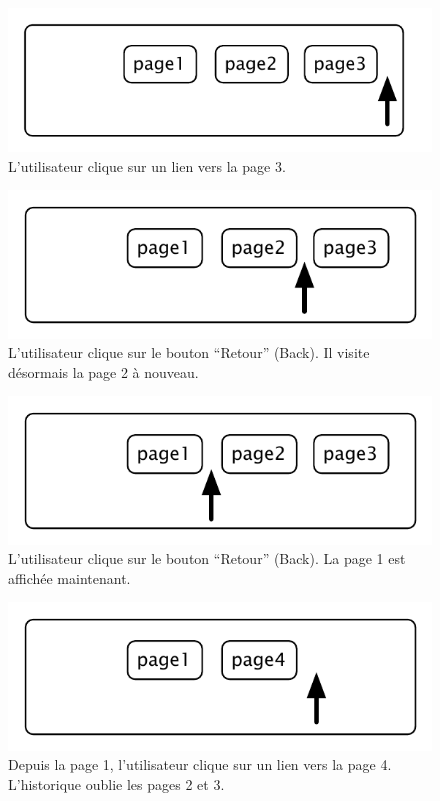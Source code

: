 \documentclass[a4paper,10pt,twoside]{book}
\begin{document}
\begin{figure}[!ht]
\centerline{\includegraphics[scale=0.5]{page3Stef}}
\caption{L'utilisateur clique sur un lien vers la page 3.}
\vspace{.2in}
\end{figure}

\begin{figure}[!ht]
\centerline{\includegraphics[scale=0.5]{page2_Stef}}
\caption{L'utilisateur clique sur le bouton ``Retour'' (Back). Il visite d\'esormais la page 2 \`a nouveau.}
\vspace{.2in}
\end{figure}

\begin{figure}[!ht]
\centerline{\includegraphics[scale=0.5]{page1_Stef}}
\caption{L'utilisateur clique sur le bouton ``Retour'' (Back). La page 1 est affich\'ee maintenant.}
\vspace{.2in}
\end{figure}

\begin{figure}[!ht]
\centerline{\includegraphics[scale=0.5]{page4Stef}}
\caption{Depuis la page 1, l'utilisateur clique sur un lien vers la page 4. L'historique oublie les pages 2 et 3.}
\vspace{.2in}
\end{figure}
\end{document}
